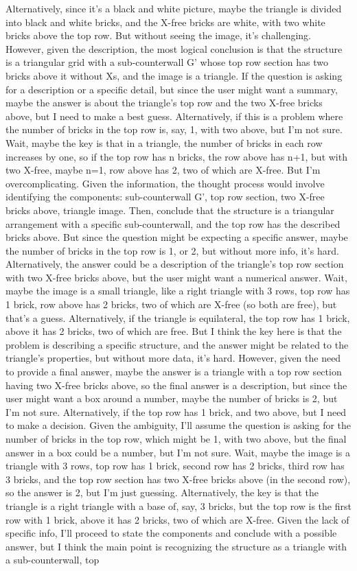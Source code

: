 Alternatively, since it's a black and white picture, maybe the triangle is divided into black and white bricks, and the X-free bricks are white, with two white bricks above the top row. But without seeing the image, it's challenging. However, given the description, the most logical conclusion is that the structure is a triangular grid with a sub-counterwall G' whose top row section has two bricks above it without Xs, and the image is a triangle. If the question is asking for a description or a specific detail, but since the user might want a summary, maybe the answer is about the triangle's top row and the two X-free bricks above, but I need to make a best guess. Alternatively, if this is a problem where the number of bricks in the top row is, say, 1, with two above, but I'm not sure. Wait, maybe the key is that in a triangle, the number of bricks in each row increases by one, so if the top row has n bricks, the row above has n+1, but with two X-free, maybe n=1, row above has 2, two of which are X-free. But I'm overcomplicating. Given the information, the thought process would involve identifying the components: sub-counterwall G', top row section, two X-free bricks above, triangle image. Then, conclude that the structure is a triangular arrangement with a specific sub-counterwall, and the top row has the described bricks above. But since the question might be expecting a specific answer, maybe the number of bricks in the top row is 1, or 2, but without more info, it's hard. Alternatively, the answer could be a description of the triangle's top row section with two X-free bricks above, but the user might want a numerical answer. Wait, maybe the image is a small triangle, like a right triangle with 3 rows, top row has 1 brick, row above has 2 bricks, two of which are X-free (so both are free), but that's a guess. Alternatively, if the triangle is equilateral, the top row has 1 brick, above it has 2 bricks, two of which are free. But I think the key here is that the problem is describing a specific structure, and the answer might be related to the triangle's properties, but without more data, it's hard. However, given the need to provide a final answer, maybe the answer is a triangle with a top row section having two X-free bricks above, so the final answer is a description, but since the user might want a box around a number, maybe the number of bricks is 2, but I'm not sure. Alternatively, if the top row has 1 brick, and two above, but I need to make a decision. Given the ambiguity, I'll assume the question is asking for the number of bricks in the top row, which might be 1, with two above, but the final answer in a box could be a number, but I'm not sure. Wait, maybe the image is a triangle with 3 rows, top row has 1 brick, second row has 2 bricks, third row has 3 bricks, and the top row section has two X-free bricks above (in the second row), so the answer is 2, but I'm just guessing. Alternatively, the key is that the triangle is a right triangle with a base of, say, 3 bricks, but the top row is the first row with 1 brick, above it has 2 bricks, two of which are X-free. Given the lack of specific info, I'll proceed to state the components and conclude with a possible answer, but I think the main point is recognizing the structure as a triangle with a sub-counterwall, top 